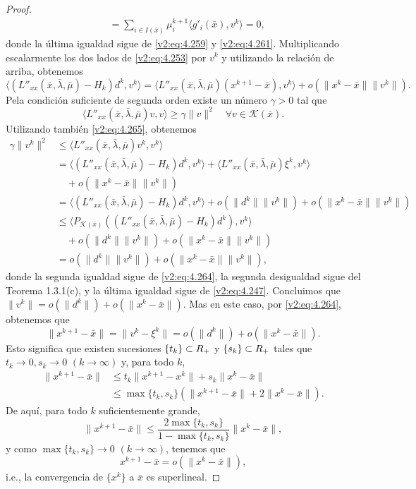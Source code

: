 \begin{proof}
\begin{align*}
        &= \sum_{i \in I(\bar{x})} \mu_i^{k+1}\langle g'_i(\bar{x}), v^k \rangle = 0,
    \end{align*}
    donde la última igualdad sigue de \eqref{v2:eq:4.259} y \eqref{v2:eq:4.261}. Multiplicando escalarmente los dos lados de \eqref{v2:eq:4.253} por $v^k$ y utilizando la relación de arriba, obtenemos
    \begin{equation}
        \langle (L''_{xx}(\bar{x}, \bar{\lambda}, \bar{\mu}) - H_k)d^k, v^k \rangle = \langle L''_{xx}(\bar{x}, \bar{\lambda}, \bar{\mu})(x^{k+1} - \bar{x}), v^k \rangle + o(\|x^k - \bar{x}\|\|v^k\|).
        \label{v2:eq:4.265}
    \end{equation}
    Pela condición suficiente de segunda orden existe un número $\gamma > 0$ tal que
    \[
        \langle L''_{xx}(\bar{x}, \bar{\lambda}, \bar{\mu})v, v \rangle \ge \gamma \|v\|^2 \quad \forall v \in \mathcal{K}(\bar{x}).
    \]
    Utilizando también \eqref{v2:eq:4.265}, obtenemos
    \begin{align*}
        \gamma\|v^k\|^2 &\le \langle L''_{xx}(\bar{x}, \bar{\lambda}, \bar{\mu})v^k, v^k \rangle \\
        &= \langle (L''_{xx}(\bar{x}, \bar{\lambda}, \bar{\mu}) - H_k)d^k, v^k \rangle + \langle L''_{xx}(\bar{x}, \bar{\lambda}, \bar{\mu})\xi^k, v^k \rangle \\
        &\quad + o(\|x^k - \bar{x}\|\|v^k\|) \\
        &= \langle (L''_{xx}(\bar{x}, \bar{\lambda}, \bar{\mu}) - H_k)d^k, v^k \rangle + o(\|d^k\|\|v^k\|) + o(\|x^k - \bar{x}\|\|v^k\|) \\
        &\le \langle P_{\mathcal{K}(\bar{x})} ((L''_{xx}(\bar{x}, \bar{\lambda}, \bar{\mu}) - H_k)d^k), v^k \rangle \\
        &\quad + o(\|d^k\|\|v^k\|) + o(\|x^k - \bar{x}\|\|v^k\|) \\
        &= o(\|d^k\|\|v^k\|) + o(\|x^k - \bar{x}\|\|v^k\|),
    \end{align*}
    donde la segunda igualdad sigue de \eqref{v2:eq:4.264}, la segunda desigualdad sigue del Teorema 1.3.1(c), y la última igualdad sigue de \eqref{v2:eq:4.247}. Concluimos que $\|v^k\| = o(\|d^k\|) + o(\|x^k - \bar{x}\|)$. Mas en este caso, por \eqref{v2:eq:4.264}, obtenemos que
    \[
        \|x^{k+1} - \bar{x}\| = \|v^k - \xi^k\| = o(\|d^k\|) + o(\|x^k - \bar{x}\|).
    \]
    Esto significa que existen sucesiones $\{t_k\} \subset R_+$ y $\{s_k\} \subset R_+$ tales que $t_k \to 0, s_k \to 0$ $(k \to \infty)$ y, para todo $k$,
    \begin{align*}
        \|x^{k+1} - \bar{x}\| &\le t_k\|x^{k+1} - x^k\| + s_k\|x^k - \bar{x}\| \\
        &\le \max\{t_k, s_k\} (\|x^{k+1} - \bar{x}\| + 2\|x^k - \bar{x}\|).
    \end{align*}
    De aquí, para todo $k$ suficientemente grande,
    \[
        \|x^{k+1} - \bar{x}\| \le \frac{2\max\{t_k, s_k\}}{1 - \max\{t_k, s_k\}} \|x^k - \bar{x}\|,
    \]
    y como $\max\{t_k, s_k\} \to 0$ $(k \to \infty)$, tenemos que
    \[
        x^{k+1} - \bar{x} = o(\|x^k - \bar{x}\|),
    \]
    i.e., la convergencia de $\{x^k\}$ a $\bar{x}$ es superlineal.
\end{proof}

